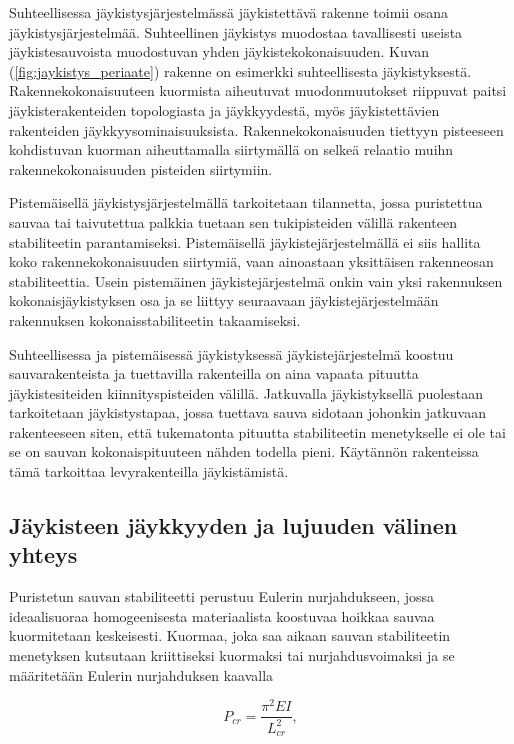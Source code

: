 \documentclass[12pt]{article}
\newenvironment{content}{\pagenumbering{arabic}}{}
\begin{document}
\begin{content}
Suhteellisessa jäykistysjärjestelmässä jäykistettävä rakenne toimii osana jäykistysjärjestelmää. Suhteellinen jäykistys muodostaa tavallisesti useista jäykistesauvoista muodostuvan yhden jäykistekokonaisuuden. Kuvan (\ref{fig:jaykistys_periaate}) rakenne on esimerkki suhteellisesta jäykistyksestä. Rakennekokonaisuuteen kuormista aiheutuvat muodonmuutokset riippuvat paitsi jäykisterakenteiden topologiasta ja jäykkyydestä, myös jäykistettävien rakenteiden jäykkyysominaisuuksista. Rakennekokonaisuuden tiettyyn pisteeseen kohdistuvan kuorman aiheuttamalla siirtymällä on selkeä relaatio muihn rakennekokonaisuuden pisteiden siirtymiin. 

Pistemäisellä jäykistysjärjestelmällä tarkoitetaan tilannetta, jossa puristettua sauvaa tai taivutettua palkkia tuetaan sen tukipisteiden välillä rakenteen stabiliteetin parantamiseksi. Pistemäisellä jäykistejärjestelmällä ei siis hallita koko rakennekokonaisuuden siirtymiä, vaan ainoastaan yksittäisen rakenneosan stabiliteettia. Usein pistemäinen jäykistejärjestelmä onkin vain yksi rakennuksen kokonaisjäykistyksen osa ja se liittyy seuraavaan jäykistejärjestelmään rakennuksen kokonaisstabiliteetin takaamiseksi.

Suhteellisessa ja pistemäisessä jäykistyksessä jäykistejärjestelmä koostuu sauvarakenteista ja tuettavilla rakenteilla on aina vapaata pituutta jäykistesiteiden kiinnityspisteiden välillä. Jatkuvalla jäykistyksellä puolestaan tarkoitetaan jäykistystapaa, jossa tuettava sauva sidotaan johonkin jatkuvaan rakenteeseen siten, että tukematonta pituutta stabiliteetin menetykselle ei ole tai se on sauvan kokonaispituuteen nähden todella pieni. Käytännön rakenteissa tämä tarkoittaa levyrakenteilla jäykistämistä.



\subsection{Jäykisteen jäykkyyden ja lujuuden välinen yhteys}

Puristetun sauvan stabiliteetti perustuu Eulerin nurjahdukseen, jossa ideaalisuoraa homogeenisesta materiaalista koostuvaa hoikkaa sauvaa kuormitetaan keskeisesti. Kuormaa, joka saa aikaan sauvan stabiliteetin menetyksen kutsutaan kriittiseksi kuormaksi tai nurjahdusvoimaksi ja se määritetään Eulerin nurjahduksen kaavalla

\begin{equation}
\label{euler}
P_{cr} = \frac{\pi^2 E I}{L_{cr}^2},
\end{equation}


\end{content}
\end{document}
